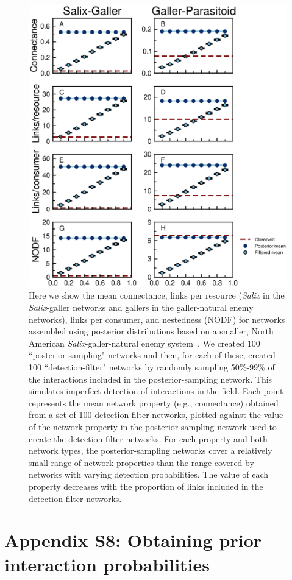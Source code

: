 \documentclass[12pt]{article}
\begin{document}
      \begin{figure}[ht]
      \caption{Here we show the mean connectance, links per resource (\emph{Salix} in the \emph{Salix}-galler networks and gallers in the galler-natural enemy networks), links per consumer, and nestedness (NODF) for networks assembled using posterior distributions based on a smaller, North American \emph{Salix}-galler-natural enemy system~\citep{Barbour2016,Barbour2016Dryad}. We created 100 ``posterior-sampling" networks and then, for each of these, created 100 ``detection-filter" networks by randomly sampling 50\%-99\% of the interactions included in the posterior-sampling network. This simulates imperfect detection of interactions in the field. Each point represents the mean network property (e.g., connectance) obtained from a set of 100 detection-filter networks, plotted against the value of the network property in the posterior-sampling network used to create the detection-filter networks. For each property and both network types, the posterior-sampling networks cover a relatively small range of network properties than the range covered by networks with varying detection probabilities. The value of each property decreases with the proportion of links included in the detection-filter networks.}
      \label{posterior_webs_Barbour}    
      \begin{center}
      \includegraphics[width=.65\textwidth]{figures/Salix_Galler_posterior_properties.eps}
      \end{center}
      \end{figure}

\clearpage

\section*{Appendix S8: Obtaining prior interaction probabilities}
\end{document}
